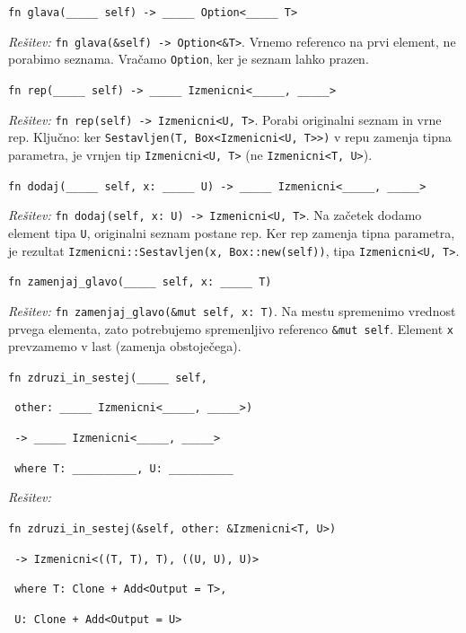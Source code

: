 \documentclass[arhiv]{../izpit}
\begin{document}
\podnaloga
\texttt{fn glava(_____ self) -> _____ Option<_____ T>}

\noindent
\emph{Rešitev:} \texttt{fn glava(&self) -> Option<&T>}. Vrnemo referenco na prvi element, ne porabimo seznama. Vračamo \texttt{Option}, ker je seznam lahko prazen.

\podnaloga
\texttt{fn rep(_____ self) -> _____ Izmenicni<_____, _____>}

\noindent
\emph{Rešitev:} \texttt{fn rep(self) -> Izmenicni<U, T>}. Porabi originalni seznam in vrne rep. Ključno: ker \texttt{Sestavljen(T, Box<Izmenicni<U, T>>)} v repu zamenja tipna parametra, je vrnjen tip \texttt{Izmenicni<U, T>} (ne \texttt{Izmenicni<T, U>}).

\podnaloga
\texttt{fn dodaj(_____ self, x: _____ U) -> _____ Izmenicni<_____, _____>}

\noindent
\emph{Rešitev:} \texttt{fn dodaj(self, x: U) -> Izmenicni<U, T>}. Na začetek dodamo element tipa \texttt{U}, originalni seznam postane rep. Ker rep zamenja tipna parametra, je rezultat \texttt{Izmenicni::Sestavljen(x, Box::new(self))}, tipa \texttt{Izmenicni<U, T>}.

\podnaloga
\texttt{fn zamenjaj_glavo(_____ self, x: _____ T)}

\noindent
\emph{Rešitev:} \texttt{fn zamenjaj_glavo(&mut self, x: T)}. Na mestu spremenimo vrednost prvega elementa, zato potrebujemo spremenljivo referenco \texttt{&mut self}. Element \texttt{x} prevzamemo v last (zamenja obstoječega).

\podnaloga

\texttt{fn zdruzi_in_sestej(_____ self,}

\texttt{    other: _____ Izmenicni<_____, _____>)}

\texttt{    -> _____ Izmenicni<_____, _____>}

\texttt{  where T: __________, U: __________}

\noindent
\emph{Rešitev:}

\texttt{fn zdruzi_in_sestej(&self, other: &Izmenicni<T, U>)}

\texttt{    -> Izmenicni<((T, T), T), ((U, U), U)>}

\texttt{  where T: Clone + Add<Output = T>,}

\texttt{        U: Clone + Add<Output = U>}
\end{document}
